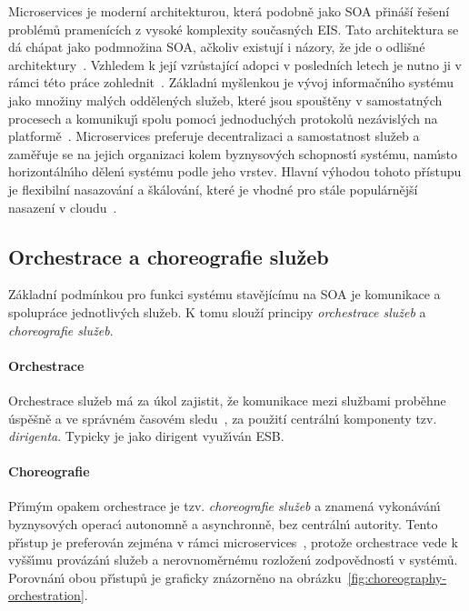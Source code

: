 Microservices je moderní architekturou, která podobně jako \gls{SOA} přináší řešení
problémů pramenících z vysoké komplexity současných \gls{EIS}.
Tato architektura se dá chápat jako podmnožina \gls{SOA}, ačkoliv existují i názory,
že jde o odlišné architektury~\cite{richards2015microservices}\cite{cerny2017disambiguation}.
Vzhledem k její vzrůstající adopci v posledních letech je nutno ji v rámci této práce zohlednit~\cite{xiao2016reflections}.
Základn\'{\i} myšlenkou je v\'yvoj informačn\'{\i}ho systému jako množiny mal\'ych oddělen\'ych služeb,
které jsou spouštěny v samostatn\'ych procesech a komunikuj\'{\i} spolu pomoc\'{\i} jednoduch\'ych
protokolů nezávislých na platformě~\cite{lewis2014microservices}. Microservices preferuje decentralizaci a samostatnost služeb
a zaměřuje se na jejich organizaci kolem byznysov\'ych schopnost\'{\i} systému, nam\'{\i}sto horizontáln\'{\i}ho
dělen\'{\i} systému podle jeho vrstev. Hlavní výhodou tohoto přístupu je flexibilní nasazování a škálování, které je vhodné
pro stále populárnější nasazení v cloudu~\cite{kratzke2017understanding}\cite{cerny2018contextual}\cite{xiao2016reflections}.

\subsection{Orchestrace a choreografie služeb}

Základní podmínkou pro funkci systému stavějícímu na \gls{SOA} je komunikace a spolupráce jednotlivých služeb.
K tomu slouží principy \textit{orchestrace služeb} a \textit{choreografie služeb}.

\paragraph{Orchestrace}
Orchestrace služeb má za úkol zajistit, že komunikace mezi službami
proběhne úspěšně a ve správném časovém sledu~\cite{orchestration},
za použití centráln\'{\i} komponenty \textendash\xspace tzv. \textit{dirigenta}.
Typicky je jako dirigent využ\'{\i}ván \gls{ESB}.

\paragraph{Choreografie}
Př\'{\i}m\'ym opakem orchestrace je tzv. \textit{choreografie služeb} a znamená
vykonáván\'{\i} byznysov\'ych operac\'{\i} autonomně a asynchronně, bez centráln\'{\i}
autority. Tento př\'{\i}stup je preferován zejména v rámci microservices~\cite{dragoni2017microservices},
protože orchestrace vede k vyšš\'{\i}mu provázán\'{\i} služeb a nerovnoměrnému rozložen\'{\i}
zodpovědnost\'{\i} v systémů. Porovnán\'{\i} obou př\'{\i}stupů je graficky
znázorněno na obrázku~\ref{fig:choreography-orchestration}.

